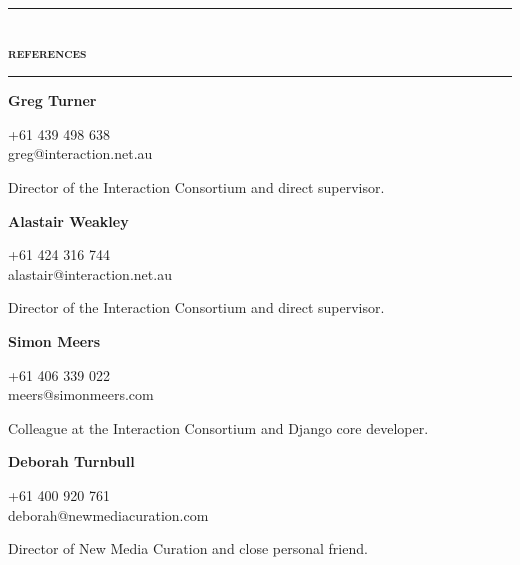 \documentclass[a4paper,12pt]{article}
\begin{document}
\begin{spacing}{0.95}
\rule[1mm]{\linewidth}{1mm}\\
{\Large\textsc{\textbf{references}}}\\
\rule[1mm]{\linewidth}{1mm}

\vspace{2mm}
\begin{minipage}[t]{45mm}
	{\small%
		\textbf{\textsf{Greg Turner}}\\
		\vspace{-4mm}\begin{spacing}{0.7}{\footnotesize{\condensed +61 439 498 638\\greg@interaction.net.au}}\\\end{spacing}
		\vspace{-1mm}Director of the Interaction Consortium and direct supervisor.%
	}%
\end{minipage}%
\hspace{5mm}%
\begin{minipage}[t]{45mm}
	{\small%
		\textbf{\textsf{Alastair Weakley}}\\
		\vspace{-4mm}\begin{spacing}{0.7}{\footnotesize{\condensed +61 424 316 744\\alastair@interaction.net.au}}\\\end{spacing}
		\vspace{-1mm}Director of the Interaction Consortium and direct supervisor.%
	}%
\end{minipage}%
\hspace{5mm}%
\begin{minipage}[t]{45mm}
	{\small%
		\textbf{\textsf{Simon Meers}}\\
		\vspace{-4mm}\begin{spacing}{0.7}{\footnotesize{\condensed +61 406 339 022\\meers@simonmeers.com}}\\\end{spacing}
		\vspace{-1mm}Colleague at the Interaction Consortium and Django core developer.%
	}%
\end{minipage}%
\hspace{5mm}%
\begin{minipage}[t]{45mm}
	{\small%
		\textbf{\textsf{Deborah Turnbull}}\\
		\vspace{-4mm}\begin{spacing}{0.7}{\footnotesize{\condensed +61 400 920 761\\deborah@newmediacuration.com}}\\\end{spacing}
		\vspace{-1mm}Director of New Media Curation and close personal friend.%
	}%
\end{minipage}
\end{spacing}
\end{document}
